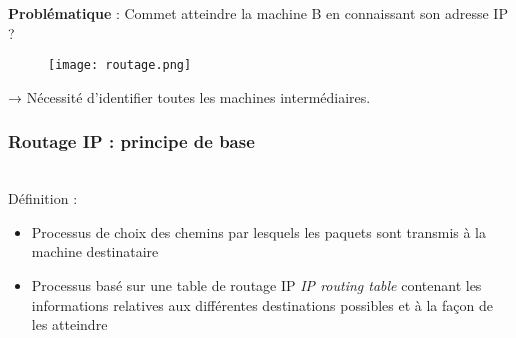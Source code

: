 \documentclass[journal, a4paper]{IEEEtran}
\begin{document}
\textbf{Problématique} : Commet atteindre la machine B en connaissant son adresse IP ?

\begin{figure}[!hbt]
	\begin{center}
	\texttt{[image: routage.png]}
	\label{fig:routage}
	\end{center}
\end{figure}

→ Nécessité d’identifier toutes les machines intermédiaires.
~\\
\subsubsection{Routage IP : principe de base}
~\\
Définition :
\begin{itemize}
	\item Processus de choix des chemins par lesquels les paquets sont transmis à la machine destinataire
	\item Processus basé sur une table de routage IP \textit{IP routing table} contenant les informations relatives aux différentes destinations possibles et à la façon de les atteindre
\end{itemize}
\end{document}
